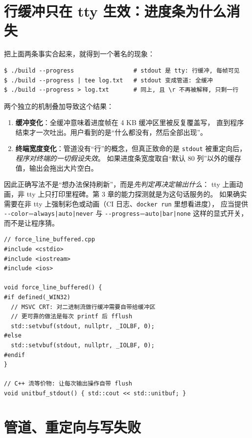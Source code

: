 \documentclass[12pt,a4paper,fontset=fandol]{ctexbook}
\newcommand{\Tp}[1]{\texttt{#1}}
\newcommand{\Opt}[1]{\texttt{-\/-#1}}
\begin{document}
\section{行缓冲只在 tty 生效：进度条为什么消失}

把上面两条事实合起来，就得到一个著名的现象：

\begin{lstlisting}[style=shellstyle,caption={进度条在终端里正常，接到管道里就消失}]
$ ./build --progress                 # stdout 是 tty: 行缓冲, 每帧可见
$ ./build --progress | tee log.txt   # stdout 变成管道: 全缓冲
$ ./build --progress > log.txt       # 同上, 且 \r 不再被解释, 只剩一行
\end{lstlisting}

两个独立的机制叠加导致这个结果：

\begin{enumerate}
\item \textbf{缓冲变化}：全缓冲意味着进度帧在 4 KB 缓冲区里被反复覆盖写，
      直到程序结束才一次吐出。用户看到的是``什么都没有，然后全部出现''。
\item \textbf{终端宽度变化}：管道没有``行''的概念，但真正致命的是
      \Tp{stdout} 被重定向后，\emph{程序对终端的一切假设失效}。
      如果进度条宽度取自``默认 80 列''以外的缓存值，输出会拖出大片空白。
\end{enumerate}

因此正确写法不是``想办法保持刷新''，而是\emph{先判定再决定输出什么}：
tty 上画动画，非 tty 上只打印里程碑。第 3 章的能力探测就是为这句话服务的。
如果确实需要在非 tty 上强制彩色或动画（CI 日志、\Tp{docker run} 里想看进度），
应当提供 \Opt{color}=\Tp{always|auto|never} 与 \Opt{progress}=\Tp{auto|bar|none}
这样的显式开关，而不是让程序猜。

\begin{lstlisting}[caption={手动把 stdout 改回行缓冲的跨平台写法}]
// force_line_buffered.cpp
#include <cstdio>
#include <iostream>
#include <ios>

void force_line_buffered() {
#if defined(_WIN32)
  // MSVC CRT: 对二进制流做行缓冲需要自带给缓冲区
  // 更可靠的做法是每次 printf 后 fflush
  std::setvbuf(stdout, nullptr, _IOLBF, 0);
#else
  std::setvbuf(stdout, nullptr, _IOLBF, 0);
#endif
}

// C++ 流等价物: 让每次输出操作自带 flush
void unitbuf_stdout() { std::cout << std::unitbuf; }
\end{lstlisting}

\section{管道、重定向与写失败}
\end{document}
